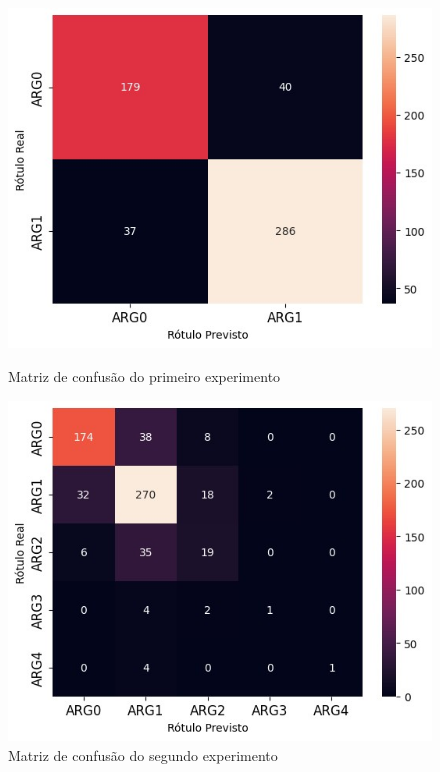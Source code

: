 \begin{figure}[htpb]
\begin{minipage}{.45\textwidth}
  \centering
  \includegraphics[width=\textwidth]{figure04.jpg}
  \caption{Matriz de confusão do primeiro experimento}
  \label{fig-04}
\end{minipage}%
\hfill
\begin{minipage}{.45\textwidth}
  \centering
  \includegraphics[width=\textwidth]{figure05.jpg}
  \caption{Matriz de confusão do segundo experimento}
  \label{fig-05}
\end{minipage}
\end{figure}

